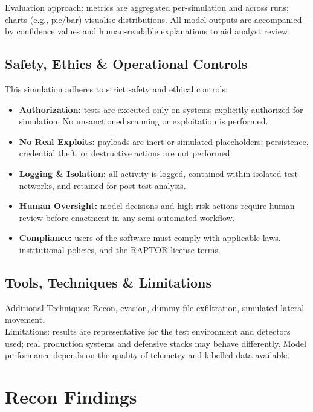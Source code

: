 \documentclass[a4paper,12pt]{article}
\begin{document}
Evaluation approach: metrics are aggregated per-simulation and across runs; charts (e.g., pie/bar) visualise distributions. All model outputs are accompanied by confidence values and human-readable explanations to aid analyst review.

\subsection*{Safety, Ethics \& Operational Controls}
This simulation adheres to strict safety and ethical controls:
\begin{itemize}
    \item \textbf{Authorization:} tests are executed only on systems explicitly authorized for simulation. No unsanctioned scanning or exploitation is performed.
    \item \textbf{No Real Exploits:} payloads are inert or simulated placeholders; persistence, credential theft, or destructive actions are not performed.
    \item \textbf{Logging \& Isolation:} all activity is logged, contained within isolated test networks, and retained for post‑test analysis.
    \item \textbf{Human Oversight:} model decisions and high‑risk actions require human review before enactment in any semi-automated workflow.
    \item \textbf{Compliance:} users of the software must comply with applicable laws, institutional policies, and the RAPTOR license terms.
\end{itemize}

\subsection*{Tools, Techniques \& Limitations}
Additional Techniques: Recon, evasion, dummy file exfiltration, simulated lateral movement. \\[0.2cm]
Limitations: results are representative for the test environment and detectors used; real production systems and defensive stacks may behave differently. Model performance depends on the quality of telemetry and labelled data available.

\newpage


\section*{Recon Findings}
\end{document}
